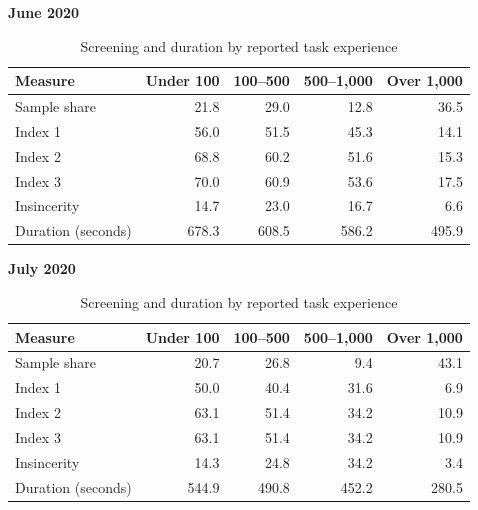 \begin{table}[htbp]\centering
\caption{Screening and duration by reported task experience}\label{tab:hits}
\textbf{June 2020}\par\smallskip
\begin{tabular}{lrrrr}
\toprule
Measure & Under 100 & 100--500 & 500--1,000 & Over 1,000 \\
\midrule
Sample share & 21.8 & 29.0 & 12.8 & 36.5 \\
Index 1 & 56.0 & 51.5 & 45.3 & 14.1 \\
Index 2 & 68.8 & 60.2 & 51.6 & 15.3 \\
Index 3 & 70.0 & 60.9 & 53.6 & 17.5 \\
Insincerity & 14.7 & 23.0 & 16.7 & 6.6 \\
Duration (seconds) & 678.3 & 608.5 & 586.2 & 495.9 \\
\bottomrule
\end{tabular}
\par\medskip
\textbf{July 2020}\par\smallskip
\begin{tabular}{lrrrr}
\toprule
Measure & Under 100 & 100--500 & 500--1,000 & Over 1,000 \\
\midrule
Sample share & 20.7 & 26.8 & 9.4 & 43.1 \\
Index 1 & 50.0 & 40.4 & 31.6 & 6.9 \\
Index 2 & 63.1 & 51.4 & 34.2 & 10.9 \\
Index 3 & 63.1 & 51.4 & 34.2 & 10.9 \\
Insincerity & 14.3 & 24.8 & 34.2 & 3.4 \\
Duration (seconds) & 544.9 & 490.8 & 452.2 & 280.5 \\
\bottomrule
\end{tabular}
\par\medskip
{}
\end{table}
